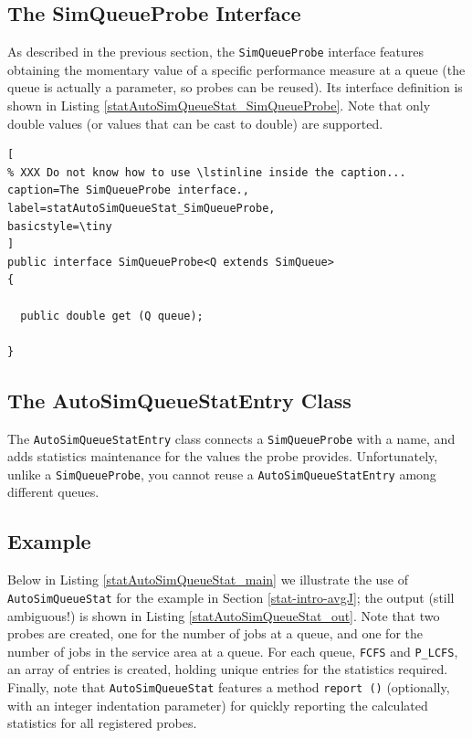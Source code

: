 \documentclass[12pt]{book}
\begin{document}
\subsection{The SimQueueProbe Interface}
\label{stat-autosimqueuestat-simqueueprobe}

As described in the previous section,
  the \lstinline-SimQueueProbe- interface
  features obtaining the momentary value of a specific performance measure
  at a queue (the queue is actually a parameter, so probes can be reused).
Its interface definition is shown in Listing \ref{statAutoSimQueueStat_SimQueueProbe}.
Note that only double values (or values that can be cast to double)
  are supported.

\begin{lstlisting}[
% XXX Do not know how to use \lstinline inside the caption...
caption=The SimQueueProbe interface.,
label=statAutoSimQueueStat_SimQueueProbe,
basicstyle=\tiny
]
public interface SimQueueProbe<Q extends SimQueue>
{
  
  public double get (Q queue);
  
}
\end{lstlisting}

\subsection{The AutoSimQueueStatEntry Class}
\label{stat-autosimqueuestat-autosimqueuestatentry}

The \lstinline|AutoSimQueueStatEntry| class connects a \lstinline|SimQueueProbe| with a name,
  and adds statistics maintenance for the values the probe provides.
Unfortunately, unlike a \lstinline|SimQueueProbe|,
  you cannot reuse a \lstinline|AutoSimQueueStatEntry| among different queues.

\subsection{Example}

Below in Listing \ref{statAutoSimQueueStat_main}
  we illustrate the use of \lstinline|AutoSimQueueStat|
  for the example in Section \ref{stat-intro-avgJ};
  the output (still ambiguous!) is shown in Listing \ref{statAutoSimQueueStat_out}.
Note that two probes are created, one for the number of jobs at a queue,
  and one for the number of jobs in the service area at a queue.
For each queue, \lstinline|FCFS| and \lstinline|P_LCFS|,
  an array of entries is created, holding
  unique entries for the statistics required.
Finally, note that \lstinline|AutoSimQueueStat| features a method \lstinline|report ()|
  (optionally, with an integer indentation parameter)
  for quickly reporting the calculated statistics for all registered probes.
\end{document}
